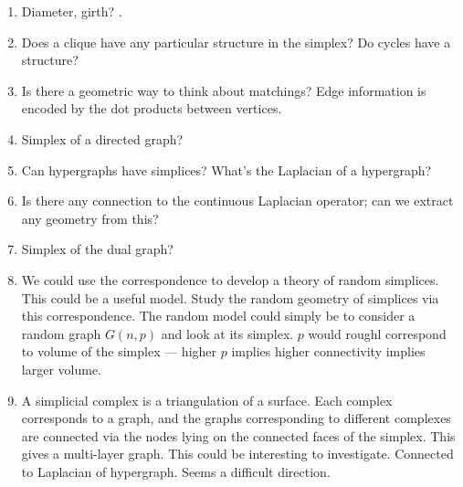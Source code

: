 \begin{enumerate}
    \item Diameter, girth? . 
    \item Does a clique have any particular structure in the simplex? Do cycles have a structure? 
    \item Is there a geometric way to think about matchings? Edge information is encoded by the dot products between vertices. 
    \item Simplex of a directed graph?  
    \item Can hypergraphs have simplices? What's the Laplacian of a hypergraph? 
    \item Is there any connection to the continuous Laplacian operator; can we extract any geometry from this?
    \item Simplex of the dual graph?
    
     
    \item We could use the correspondence to develop a theory of random simplices. This could be a useful model. Study the random geometry of simplices via this correspondence. The random model could simply be to consider a random graph $G(n,p)$ and look at its simplex. $p$ would roughl correspond to volume of the simplex --- higher $p$ implies higher connectivity implies larger volume. 
    \item A simplicial complex is a triangulation of a surface. Each complex corresponds to a graph, and the graphs corresponding to different complexes are connected via the nodes lying on the connected faces of the simplex. This gives a multi-layer graph. This could be interesting to investigate.  Connected to Laplacian of hypergraph. Seems a difficult direction.  
    
    
\end{enumerate}

